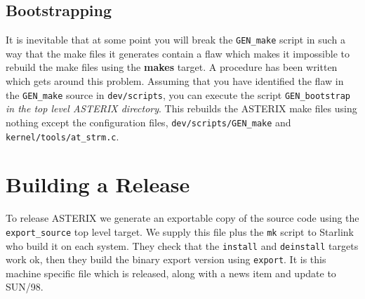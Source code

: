 \subsection{Bootstrapping}

It is inevitable that at some point you will break the \verb+GEN_make+
script in such a way that the make files it generates contain a flaw
which makes it impossible to rebuild the make files using the {\bf makes}
target. A procedure has
been written which gets around this problem. Assuming that you have
identified the flaw in the \verb+GEN_make+ source in \verb+dev/scripts+,
you can execute the script \verb+GEN_bootstrap+ {\em in the top level
ASTERIX directory}. This rebuilds the ASTERIX make files using nothing 
except the configuration files, \verb+dev/scripts/GEN_make+ and
\verb+kernel/tools/at_strm.c+.

\section{Building a Release}

To release ASTERIX we generate an exportable copy of the source code
using the \verb+export_source+ top level target. We supply this file
plus the \verb+mk+ script to Starlink who build it on each system. 
They check that the \verb+install+
and \verb+deinstall+ targets work ok, then they build the binary export 
version using \verb+export+. It is this machine specific file which is
released, along with a news item and update to SUN/98.

